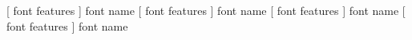 [ font features ]  font name 
 [ font features ]  font name 
 [ font features ]  font name 
 [ font features ]  font name 
